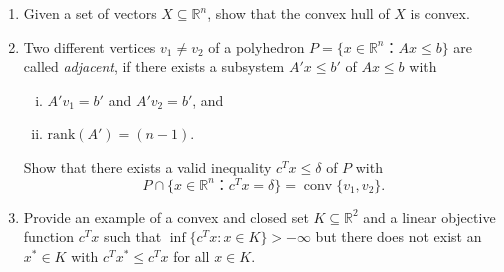 \documentclass[11pt]{article}
\institute{\'Ecole Polytechnique F\'ed\'erale de Lausanne}
\DeclareMathOperator{\conv}{conv}
\newcommand{\setR}{\mathbb{R}}
\renewcommand{\leq}{\leqslant}
\renewcommand{\geq}{\geqslant}
\newcommand{\rank}{\mathrm{rank}}
\begin{document}
\makeheader

\begin{enumerate}[1)]

\item \label{convex-hull}
Given a set of vectors $X \subseteq \setR^n$, show that the convex hull of $X$ is convex. 

\item \label{adjacent-vertices}
Two different vertices $v_1 ≠ v_2$ of a polyhedron $P = \{ x ∈ ℝ^n ： Ax≤b\}$ are called \emph{adjacent}, if there exists a subsystem $A'x ≤ b'$ of $Ax≤b$ with
\begin{enumerate}[i)] 
\item $A'v_1 = b'$ and $A'v_2 = b'$, and
\item $\rank(A') = (n-1)$. 
\end{enumerate}
Show that there exists a valid inequality $c^Tx ≤ δ$ of $P$ with
\begin{displaymath}
P ∩ \{ x ∈ ℝ^n ： c^Tx = δ \} = \conv\{v_1,v_2\}. 
\end{displaymath}



  
  
\item Provide an example of a convex and closed set $K\subseteq\setR^2$ and a
  linear objective function $c^Tx$ such that $\inf\{c^Tx \colon
  x\in K\}>-\infty$ but there does not exist an $x^* \in K$ with $c^Tx^* \leq
  c^Tx$ for all $x \in K$. 
  


\end{enumerate}
\end{document}
